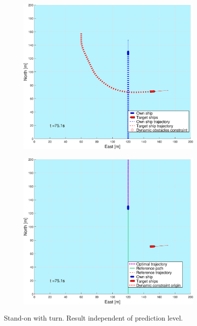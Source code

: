 \begin{figure}[ht!]
\begin{subfigure}[b]{0.494\textwidth}
        \subcaption{}
    \end{subfigure}
    \hfill
    \\
    \begin{subfigure}[b]{0.494\textwidth}
        \centering
        \includegraphics[width=\textwidth]{Images/Figures/sving_SO/_Simple_0fig1_time=75}
        \subcaption{}
    \end{subfigure}
    \hfill
    \begin{subfigure}[b]{0.494\textwidth}
        \centering
        \includegraphics[width=\textwidth]{Images/Figures/sving_SO/_Simple_0fig999_time=75}
        \subcaption{}
    \end{subfigure}
    \hfill
    \caption{Stand-on with turn. Result independent of prediction level.}
    \label{FIG: turn SO}
\end{figure}%
